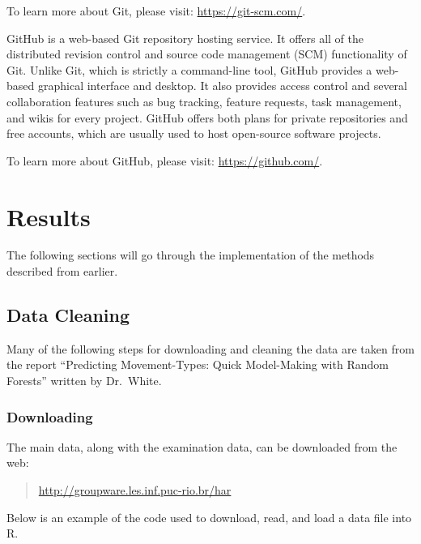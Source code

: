 \documentclass[12pt,twoside]{reedthesis}
\begin{document}
  To learn more about Git, please visit: \url{https://git-scm.com/}.
  
  GitHub is a web-based Git repository hosting service. It offers all of
  the distributed revision control and source code management (SCM)
  functionality of Git. Unlike Git, which is strictly a command-line tool,
  GitHub provides a web-based graphical interface and desktop. It also
  provides access control and several collaboration features such as bug
  tracking, feature requests, task management, and wikis for every
  project. GitHub offers both plans for private repositories and free
  accounts, which are usually used to host open-source software projects.
  
  To learn more about GitHub, please visit: \url{https://github.com/}.
  
  \chapter{Results}\label{results}
  
  The following sections will go through the implementation of the methods
  described from earlier.
  
  \section{Data Cleaning}\label{data-cleaning}
  
  Many of the following steps for downloading and cleaning the data are
  taken from the report ``Predicting Movement-Types: Quick Model-Making
  with Random Forests'' written by Dr.~White.
  
  \subsection{Downloading}\label{downloading}
  
  The main data, along with the examination data, can be downloaded from
  the web:
  
  \begin{quote}
  \url{http://groupware.les.inf.puc-rio.br/har}
  \end{quote}
  
  Below is an example of the code used to download, read, and load a data
  file into R.
  
  \begin{Shaded}
  \begin{Highlighting}[]
  \StringTok{ }\NormalTok{(}\NormalTok{,}
                    \NormalTok{,}
                     \NormalTok{)}
  \StringTok{ } \NormalTok{)}
   \NormalTok{)}
  \end{Highlighting}
  \end{Shaded}
  
\end{document}
